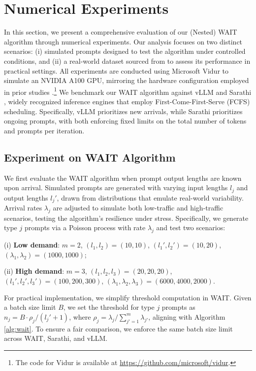 \section{Numerical Experiments}
\label{sec:experiments}

In this section, we present a comprehensive evaluation of our (Nested) WAIT algorithm through numerical experiments. Our analysis focuses on two distinct scenarios: (i) simulated prompts designed to test the algorithm under controlled conditions, and (ii) a real-world dataset sourced from \cite{zheng2023lmsys} to assess its performance in practical settings. All experiments are conducted using Microsoft Vidur to simulate an NVIDIA A100 GPU, mirroring the hardware configuration employed in prior studies \citep{agrawal2024vidur}.\footnote{The code for Vidur is available at \url{https://github.com/microsoft/vidur}.} We benchmark our WAIT algorithm against vLLM \citep{kwon2023efficient} and Sarathi \citep{agrawal2023sarathi}, widely recognized inference engines that employ First-Come-First-Serve (FCFS) scheduling. Specifically, vLLM prioritizes new arrivals, while Sarathi prioritizes ongoing prompts, with both enforcing fixed limits on the total number of tokens and prompts per iteration.

\subsection{Experiment on WAIT Algorithm}
We first evaluate the WAIT algorithm when prompt output lengths are known upon arrival. Simulated prompts are generated with varying input lengths \( l_j \) and output lengths \( l_j' \), drawn from distributions that emulate real-world variability. Arrival rates \( \lambda_j \) are adjusted to simulate both low-traffic and high-traffic scenarios, testing the algorithm's resilience under stress. Specifically, we generate type \( j \) prompts via a Poisson process with rate \( \lambda_j \) and test two scenarios:

(i) \textbf{Low demand}: \( m=2 \), \( (l_1, l_2) = (10, 10) \), \( (l_1', l_2') = (10, 20) \), \( (\lambda_1, \lambda_2) = (1000, 1000) \);  

(ii) \textbf{High demand}: \( m=3 \), \( (l_1, l_2, l_3) = (20, 20, 20) \), \( (l_1', l_2', l_3') = (100, 200, 300) \), \( (\lambda_1, \lambda_2, \lambda_3) = (6000, 4000, 2000) \).

For practical implementation, we simplify threshold computation in WAIT. Given a batch size limit \( B \), we set the threshold for type \( j \) prompts as \( n_j = B \cdot \rho_j / (l_j' + 1) \), where \( \rho_j = \lambda_j / \sum_{j'=1}^m \lambda_{j'} \), aligning with Algorithm \ref{alg:wait}. To ensure a fair comparison, we enforce the same batch size limit across WAIT, Sarathi, and vLLM.

